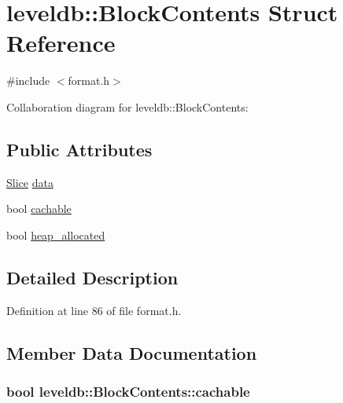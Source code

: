 \hypertarget{structleveldb_1_1_block_contents}{}\section{leveldb\+:\+:Block\+Contents Struct Reference}
\label{structleveldb_1_1_block_contents}


{\ttfamily \#include $<$format.\+h$>$}



Collaboration diagram for leveldb\+:\+:Block\+Contents\+:
\subsection*{Public Attributes}
\begin{DoxyCompactItemize}
\item 
\hyperlink{classleveldb_1_1_slice}{Slice} \hyperlink{structleveldb_1_1_block_contents_aa30fe6388fe0f89d5565f6bae788c28e}{data}
\item 
bool \hyperlink{structleveldb_1_1_block_contents_ad9cbcf81fb1378ce5f9a0db2e8d4b539}{cachable}
\item 
bool \hyperlink{structleveldb_1_1_block_contents_a0d4390fa3d4041ac5a3da51cbb16e315}{heap\+\_\+allocated}
\end{DoxyCompactItemize}


\subsection{Detailed Description}


Definition at line 86 of file format.\+h.



\subsection{Member Data Documentation}
\hypertarget{structleveldb_1_1_block_contents_ad9cbcf81fb1378ce5f9a0db2e8d4b539}{}
\subsubsection[{cachable}]{\setlength{\rightskip}{0pt plus 5cm}bool leveldb\+::\+Block\+Contents\+::cachable}\label{structleveldb_1_1_block_contents_ad9cbcf81fb1378ce5f9a0db2e8d4b539}


